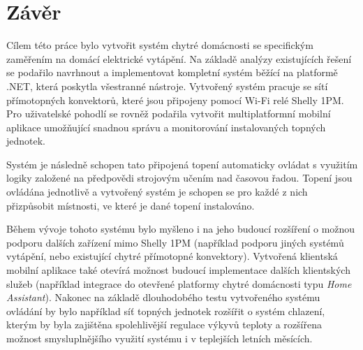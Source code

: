 \chapter{Závěr}
\label{zaver}
Cílem této práce bylo vytvořit systém chytré domácnosti se specifickým zaměřením na domácí elektrické vytápění. Na základě analýzy existujících řešení se podařilo navrhnout a implementovat kompletní systém běžící na platformě .NET, která poskytla všestranné nástroje. Vytvořený systém pracuje se sítí přímotopných konvektorů, které jsou připojeny pomocí Wi-Fi relé Shelly 1PM. Pro uživatelské pohodlí se rovněž podařila vytvořit multiplatformní mobilní aplikace umožňující snadnou správu a monitorování instalovaných topných jednotek.

Systém je následně schopen tato připojená topení automaticky ovládat s využitím logiky založené na předpovědi strojovým učením nad časovou řadou. Topení jsou ovládána jednotlivě a vytvořený systém je schopen se pro každé z nich přizpůsobit místnosti, ve které je dané topení instalováno.

Během vývoje tohoto systému bylo myšleno i na jeho budoucí rozšíření o možnou podporu dalších zařízení mimo Shelly 1PM (například podporu jiných systémů vytápění, nebo existující chytré přímotopné konvektory). Vytvořená klientská mobilní aplikace také otevírá možnost budoucí implementace dalších klientských služeb (například integrace do otevřené platformy chytré domácnosti typu {\it Home Assistant}). Nakonec na základě dlouhodobého testu vytvořeného systému ovládání by bylo například síť topných jednotek rozšířit o systém chlazení, kterým by byla zajištěna spolehlivější regulace výkyvů teploty a rozšířena možnost smysluplnějšího využití systému i v teplejších letních měsících.

